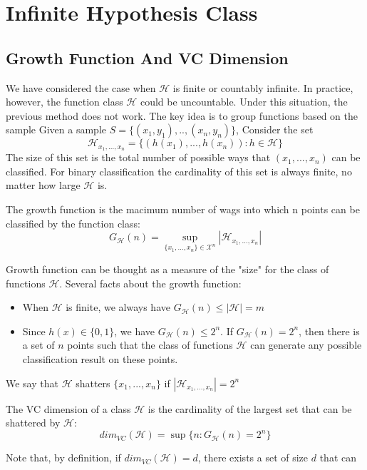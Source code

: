 \section{Infinite Hypothesis Class}
\subsection{Growth Function And VC Dimension}
We have considered the case when $\mathcal{H}$ is finite or countably infinite. In practice, however, the function class
$\mathcal{H}$ could be uncountable. Under this situation, the previous method does not work. The key idea is to group
functions based on the sample
Given a sample $S=\{(x_1,y_1),..,(x_n,y_n)\}$, Consider the set
$$\mathcal{H}_{x_1,...,x_n} = \{(h(x_1),...,h(x_n)) : h\in \mathcal{H}\} $$
The size of this set is the total number of possible ways that $(x_1,...,x_n)$ can be classified. For binary classification the cardinality of this set is always finite, no matter how large $\mathcal{H}$ is.
\begin{definition}
	The growth function is the macimum number of wags into which n points
	can be classified by the function class:
	$$G_\mathcal{H}(n) = \sup_{\{x_1,...,x_n\} \in \mathcal{X}^n} |\mathcal{H}_{x_1,...,x_n}|$$
\end{definition}
\noindent Growth function can be thought as a measure of the "size" for the class of functions $\mathcal{H}$. Several facts about the growth function:
\begin{itemize}
	\item When $\mathcal{H}$ is finite, we always have $G_\mathcal{H}(n) \leq |\mathcal{H}|=m$
	\item 	Since $h(x)\in \{0,1\}$, we have $G_\mathcal{H}(n) \leq2^n$. If $G_\mathcal{H}(n) =2^n$, then there is a set of $n$ points such that the class of functions $\mathcal{H}$ can generate any possible classification result on these points.
\end{itemize}	
\begin{definition}[Shatterring]
	We say that $\mathcal{H}$ shatters $\{x_1,...,x_n\}$ if $|\mathcal{H}_{x_1,...,x_n}|=2^n$
\end{definition}
\begin{definition}[VC Dimension]
	The VC dimension of a class $\mathcal{H}$ is the cardinality of the largest set that can be shattered by $\mathcal{H}$:
	$$dim_{VC}(\mathcal{H})= \sup\{n : G_\mathcal{H}(n)=2^n\}$$
\end{definition}
Note that, by definition, if $dim_{VC}(\mathcal{H})=d$, there exists a set of size $d$ that can
